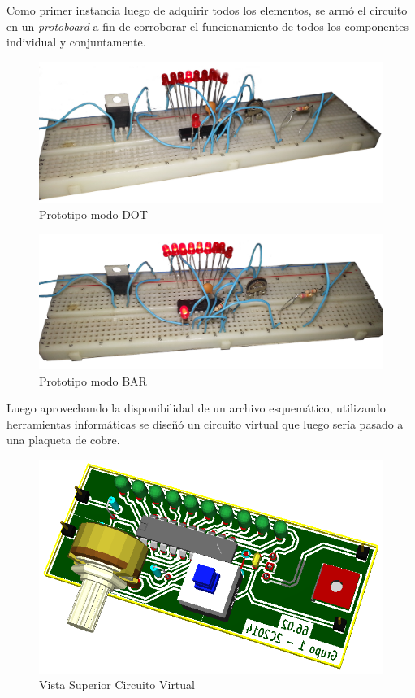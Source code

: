 \documentclass[12pt,a4paper]{article}
\begin{document}
			Como primer instancia luego de adquirir todos los elementos, se armó el circuito en un \textit{protoboard} a fin de corroborar el funcionamiento de todos los componentes individual y conjuntamente.

			\begin{figure}[H]
			\centering
				\includegraphics[scale=0.1]{images/proto_dot.jpg}\caption{Prototipo modo DOT}
			\end{figure}

			\begin{figure}[H]
			\centering
				\includegraphics[scale=0.1]{images/proto_bar.jpg}\caption{Prototipo modo BAR}
			\end{figure}

			Luego aprovechando la disponibilidad de un archivo esquemático, utilizando herramientas informáticas se diseñó un circuito virtual que luego sería pasado a una plaqueta de cobre.

			\begin{figure}[H]
			\centering
				\includegraphics[scale=0.4]{images/virt_sup.png}\caption{Vista Superior Circuito Virtual}
			\end{figure}
\end{document}
